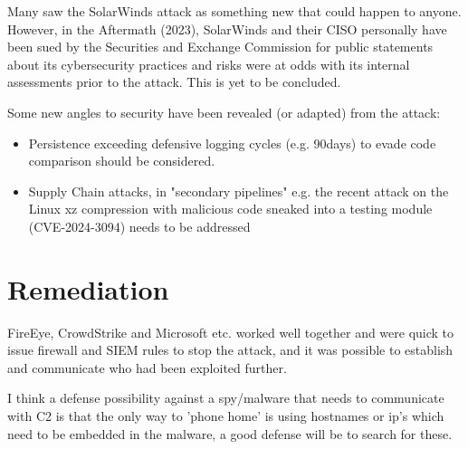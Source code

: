 \documentclass[
	letterpaper, %
	10pt, %
	unnumberedsections, %
	twoside, %
]{LTJournalArticle}
\begin{document}
Many saw the SolarWinds attack as something new that could happen to anyone. However, in the Aftermath (2023), SolarWinds and their CISO personally have been sued by the Securities and Exchange Commission\cite{SECLawsuit} for public statements about its cybersecurity practices and risks were at odds with its internal assessments prior to the attack. This is yet to be concluded.

Some new angles to security have been revealed (or adapted) from the attack:
\begin{itemize}
	\item Persistence exceeding defensive logging cycles (e.g. 90days) to evade code comparison should be considered.
	\item Supply Chain attacks, in "secondary pipelines" e.g. the recent attack on the Linux xz compression with malicious code sneaked into a testing module (CVE-2024-3094\cite{NISTCVE20243094}) needs to be addressed
\end{itemize}


\section{Remediation} 
FireEye, CrowdStrike and Microsoft etc. worked well together and were quick to issue firewall and SIEM rules to stop the attack, and it was possible to establish and communicate who had been exploited further. 

I think a defense possibility against a spy/malware that needs to communicate with C2 is that the only way to 'phone home' is using hostnames or ip's which need to be embedded in the malware, a good defense will be to search for these. 

\printbibliography %



\end{document}
